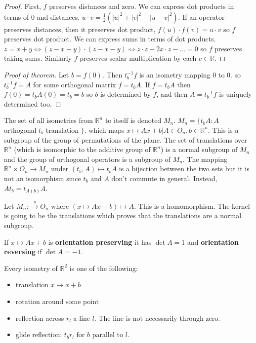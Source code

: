 \documentclass{article}
\newcommand{\vocab}[1]{\textbf{\color{blue!90}\boldmath #1}}
\newcommand{\R}{\mathbb{R}}
\newcommand{\ra}[1][]{\xrightarrow{#1}}
\begin{document}
\begin{proof}
First, $f$ preserves distances and zero. We can express dot products in terms of 0 and distances. $u\cdot v=\frac{1}{2}(|u|^2+|v|^2-|u-v|^2)$. If an operator preserves distances, then it preserves dot product, $f(u)\cdot f(v)=u\cdot v$ so $f$ preserves dot product. We can express sums in terms of dot products. $z=x+y\iff (z-x-y)\cdot(z-x-y)\iff z\cdot z-2x\cdot z-...=0$ so $f$ preserves taking sums. Similarly $f$ preserves scalar multiplication by each $c\in \R$. 
\end{proof}
\begin{proof}[Proof of theorem]
Let $b=f(0)$. Then $t_b^{-1}f$ is an isometry mapping 0 to 0. so $t^{-1}_bf=A$ for some orthogonal matrix $f=t_bA$. If $f=t_bA$ then $f(0)=t_bA(0)=t_b=b$ so $b$ is determined by $f$, and then $A=t^{-1}_bf$ is uniquely determined too.
\end{proof}
\begin{definition}
The set of all isometries from $\R^n$ to itself is denoted $M_n$. $M_n=\{t_bA:A$ orthogonal $t_b$ translation $\}$. which maps $x\mapsto Ax+b|A\in O_n, b\in \R^n$. This is a subgroup of the group of permutations of the plane. The set of translations over $\R^n$ (which is isomorphic to the additive group of $\R^n$) is a normal subgroup of $M_n$ and the group of orthogonal operators is a subgroup of $M_n$. The mapping $\R^n\times O_n\ra M_n$ under $(t_b,A)\mapsto t_bA$ is a bijection between the two sets but it is not an isomorphism since $t_b$ and $A$ don't commute in general. Instead, $At_b=t_{A(b)}A$.
\end{definition}
Let $M_n:\ra[\pi]O_n$ where $(x\mapsto Ax+b)\mapsto A$. This is a homomorphism. The kernel is going to be the translations which proves that the translations are a normal subgroup. 
\begin{definition}
If $x\mapsto Ax+b$ is \vocab{orientation preserving} it has $\det A=1$ and \vocab{orientation reversing} if $\det A=-1$. 
\end{definition}
\begin{theorem}
Every isometry of $\R^2$ is one of the following:
\begin{itemize}
    \item translation $x\mapsto x+b$
    \item rotation around some point
    \item reflection across $r_l$ a line $l$. The line is not necessarily through zero.
    \item glide reflection: $t_br_l$ for $b$ parallel to $l$. 
\end{itemize}
\end{theorem}
\end{document}
